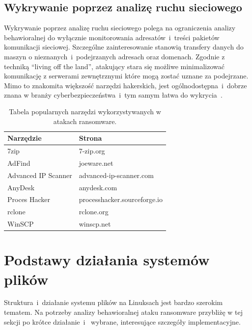 \subsection{Wykrywanie poprzez analizę ruchu sieciowego}
Wykrywanie poprzez analizę ruchu sieciowego polega na ograniczenia analizy behawioralnej do wyłącznie monitorowania adresatów~i~treści pakietów komunikacji sieciowej.
Szczególne zainteresowanie stanowią transfery danych do maszyn o nieznanych~i~podejrzanych adresach
oraz domenach. Zgodnie z techniką \foreignquote{english}{living off the land}, atakujący stara się
możliwe minimalizować komunikację z serwerami zewnętrznymi które mogą zostać uznane za podejrzane. Mimo to 
znakomita większość narzędzi hakerskich, jest ogólnodostępna~i~dobrze znana w branży
cyberbezpieczeństwa~i~tym samym łatwa do wykrycia~\cite{sans_secure}.  
\begin{table}[H]
    \centering
    \begin{tabular}{ll}
    \hline
    \multicolumn{1}{|l|}{Narzędzie} & \multicolumn{1}{l|}{Strona}  \\ \hline
    7zip                            & 7-zip.org                    \\
    AdFind                          & joeware.net                  \\
    Advanced IP Scanner             & advanced-ip-scanner.com      \\
    AnyDesk                         & anydesk.com                  \\
    Proces Hacker                   & processhacker.sourceforge.io \\
    rclone                          & rclone.org                   \\
    WinSCP                          & winscp.net                  
    \end{tabular}
    \caption{Tabela popularnych narzędzi wykorzystywanych w atakach ransomware\protect\footnotemark.}
\end{table}
\section{Podstawy działania systemów plików}
Struktura~i~działanie systemu plików na Linuksach jest bardzo szerokim tematem.
Na potrzeby analizy behawioralnej ataku ransomware przybliżę w tej sekcji po krótce działanie~i~
wybrane, interesujące szczegóły implementacyjne.
